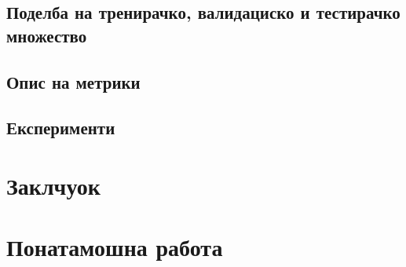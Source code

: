 \documentclass[12pt]{article}
\numberwithin{equation}{section}
\begin{document}
\subsection{Поделба на тренирачко, валидациско и тестирачко множество}

\subsection{Опис на метрики}

\subsection{Експерименти}

\newpage

\section{Заклчуок}

\newpage

\section{Понатамошна работа}

\newpage

\listoffigures

\newpage

\lstlistoflistings

\newpage



\end{document}
